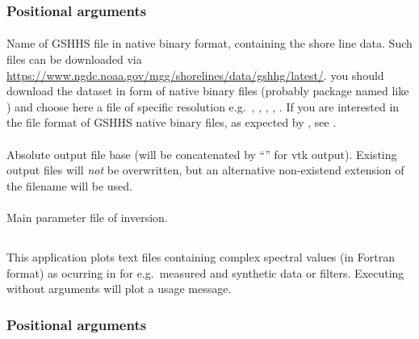 \subsubsection{Positional arguments}
\paragraph{}
Name of GSHHS file in native binary format, containing the shore line data. Such files can be downloaded
via \url{https://www.ngdc.noaa.gov/mgg/shorelines/data/gshhg/latest/}. you should download the 
dataset in form of native binary files (probably package named like ) and choose here
a file of specific resolution e.g.\ , 
, , , .
If you are interested in the file format of GSHHS native binary files, as expected by \ASKI{}, see
.
\paragraph{}
Absolute output file base (will be concatenated by ``'' for vtk output). Existing output files 
will \emph{not} be overwritten, but an alternative non-existend extension of the filename will be used.
\paragraph{}
Main parameter file of inversion.

\subsection{} \label{programs_scripts,sec:py,sec:plotspec}
This application plots text files containing complex spectral values (in Fortran format) as ocurring
in \ASKI{} for e.g.\ measured and synthetic data or filters.
Executing  without arguments will plot a usage message.
\subsubsection{Positional arguments}
